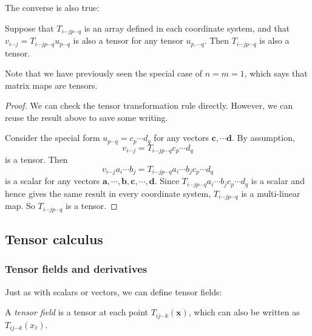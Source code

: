 \documentclass[a4paper]{article}
\begin{document}
The converse is also true:
\begin{prop}
  Suppose that $T_{i\cdots jp\cdots q}$ is an array defined in each coordinate system, and that $v_{i\cdots j} = T_{i\cdots jp\cdots q} u_{p\cdots q}$ is also a tensor for any tensor $u_{p, \cdots q}$. Then $T_{i\cdots j p\cdots q}$ is also a tensor.
\end{prop}

Note that we have previously seen the special case of $n = m = 1$, which says that matrix maps are tensors.
\begin{proof}
  We can check the tensor transformation rule directly. However, we can reuse the result above to save some writing.

  Consider the special form $u_{p \cdots q} = c_p \cdots d_q$ for any vectors $\mathbf{c}, \cdots \mathbf{d}$. By assumption, 
  \[
    v_{i\cdots j} = T_{i\cdots jp\cdots q}c_p\cdots d_q
  \]
  is a tensor. Then
  \[
    v_{i\cdots j}a_i \cdots b_j = T_{i\cdots jp\cdots q}a_i\cdots b_jc_p\cdots d_q
  \]
  is a scalar for any vectors $\mathbf{a}, \cdots, \mathbf{b}, \mathbf{c},\cdots, \mathbf{d}$. Since $T_{i\cdots jp\cdots q}a_i\cdots b_jc_p\cdots d_q$ is a scalar and hence gives the same result in every coordinate system, $T_{i\cdots jp\cdots q}$ is a multi-linear map. So $T_{i\cdots jp\cdots q}$ is a tensor.
\end{proof}

\subsection{Tensor calculus}
\subsubsection{Tensor fields and derivatives}
Just as with scalars or vectors, we can define tensor fields:
\begin{defi}
  A \emph{tensor field} is a tensor at each point $T_{ij\cdots k}(\mathbf{x})$, which can also be written as $T_{ij\cdots k}(x_\ell)$.
\end{defi}
\end{document}
